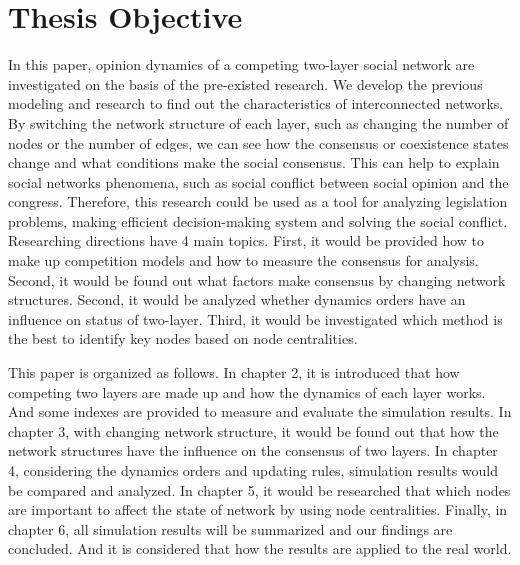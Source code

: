 \section{Thesis Objective}
In this paper, opinion dynamics of a competing two-layer social network are investigated on the basis of the pre-existed research\parencite{alvarez2016, gomez2015, diep2017, rocca2014}. We develop the previous modeling and research to find out the characteristics of interconnected networks. By switching the network structure of each layer, such as changing the number of nodes or the number of edges, we can see how the consensus or coexistence states change and what conditions make the social consensus. This can help to explain social networks phenomena, such as social conflict between social opinion and the congress. Therefore, this research could be used as a tool for analyzing legislation problems, making efficient decision-making system and solving the social conflict. 
Researching directions have 4 main topics. First, it would be provided how to make up competition models and how to measure the consensus for analysis. Second, it would be found out what factors make consensus by changing network structures. Second, it would be analyzed whether dynamics orders have an influence on status of two-layer. Third, it would be investigated which method is the best to identify key nodes based on node centralities.

This paper is organized as follows. In chapter 2, it is introduced that how competing two layers are made up and how the dynamics of each layer works. And some indexes are provided to measure and evaluate the simulation results. In chapter 3, with changing network structure, it would be found out that how the network structures have the influence on the consensus of two layers. In chapter 4, considering the dynamics orders and updating rules, simulation results would be compared and analyzed. In chapter 5, it would be researched that which nodes are important to affect the state of network by using node centralities. Finally, in chapter 6, all simulation results will be summarized and our findings are concluded. And it is considered that how the results are applied to the real world. 


